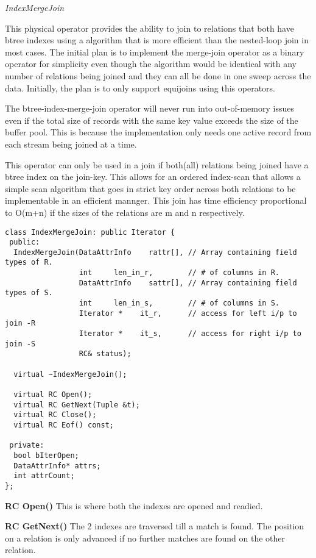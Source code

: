 \documentclass[letterpaper,11pt]{article}
\newcommand{\resheading}[1]{{\vspace{0.1in}\large {\textbf{\textsf{#1 \vphantom{p\^{E}}}}}}}
\begin{document}
\resheading{}
\emph{IndexMergeJoin}
\resheading{}

This physical operator provides the ability to join to relations that both have
btree indexes using a algorithm that is more efficient than the nested-loop join
in most cases.
The initial plan is to implement the merge-join operator as a binary operator
for simplicity even though the algorithm would be identical with any number of
relations being joined and they can all be done in one sweep across the
data. Initially, the plan is to only support equijoins using this operators.

The btree-index-merge-join operator will never run into out-of-memory issues
even if the total size of records with the same key value exceeds the size of
the buffer pool. This is because the implementation only needs one active record
from each stream being joined at a time.

This operator can only be used in a join if both(all) relations being joined
have a btree index on the join-key. This allows for an ordered index-scan that
allows a simple scan algorithm that goes in strict key order across both
relations to be implementable in an efficient mannger. This join has time
efficiency proportional to O(m+n) if the sizes of the relations are m and n
respectively.


\begin{verbatim}
class IndexMergeJoin: public Iterator {
 public:
  IndexMergeJoin(DataAttrInfo    rattr[], // Array containing field types of R.
                 int     len_in_r,        // # of columns in R.
                 DataAttrInfo    sattr[], // Array containing field types of S.
                 int     len_in_s,        // # of columns in S.                 
                 Iterator *    it_r,      // access for left i/p to join -R
                 Iterator *    it_s,      // access for right i/p to join -S
                 RC& status);

  virtual ~IndexMergeJoin();

  virtual RC Open();
  virtual RC GetNext(Tuple &t);
  virtual RC Close();
  virtual RC Eof() const;

 private:
  bool bIterOpen;
  DataAttrInfo* attrs;
  int attrCount;
};
\end{verbatim}

  \resheading{RC Open()}
This is where both the indexes are opened and readied.

  \resheading{RC GetNext()}
The 2 indexes are traversed till a match is found.  The position on a relation
is only advanced if no further matches are found on the other relation.
\end{document}
